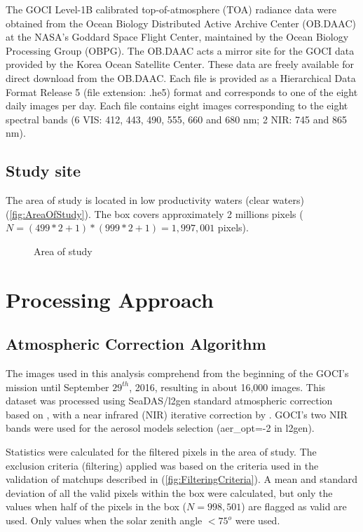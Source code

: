 \documentclass[onecolumn,3p,letterpaper,11pt]{elsarticle}
\begin{document}
The GOCI Level-1B calibrated top-of-atmosphere (TOA) radiance data were obtained from the Ocean Biology Distributed Active Archive Center (OB.DAAC) at the NASA's Goddard Space Flight Center, maintained by the Ocean Biology Processing Group (OBPG). The OB.DAAC acts a mirror site for the GOCI data provided by the Korea Ocean Satellite Center. These data are freely available for direct download from the OB.DAAC. Each file is provided as a  Hierarchical Data Format Release 5 (file extension: .he5) format and corresponds to one of the eight daily images per day. Each file contains eight images corresponding to the eight spectral bands (6 VIS: 412, 443, 490, 555, 660 and 680 nm; 2 NIR: 745 and 865 nm).
\subsection{Study site}

The area of study is located in low productivity waters (clear waters)(\autoref{fig:AreaOfStudy}). The box covers approximately 2 millions pixels ($N = (499*2+1)*(999*2+1) =  1,997,001$ pixels).

\begin{figure}[ht]
	\centering
	\caption{Area of study}
	\label{fig:AreaOfStudy}
\end{figure}
\section{Processing Approach}
\subsection{Atmospheric Correction Algorithm}
The images used in this analysis comprehend from the beginning of the GOCI's mission until September $29^{th}$, 2016, resulting in about 16,000 images. This dataset was processed using SeaDAS/l2gen standard atmospheric correction based on \citet{Gordon1994}, with a near infrared (NIR) iterative correction by \citet{Bailey2010}. GOCI's two NIR bands were used for the aerosol models selection ({\ttfamily aer\_opt=-2} in l2gen). 

Statistics were calculated for the filtered pixels in the area of study. The exclusion criteria (filtering) applied was based on the criteria used in the validation of matchups described in \citet{Bailey2006} (\autoref{fig:FilteringCriteria}). A mean and standard deviation of all the valid pixels within the box were calculated, but only the values when half of the pixels in the box ($N=998,501$) are flagged as valid are used. Only values when the solar zenith angle $< 75^o$ were used.
\end{document}
